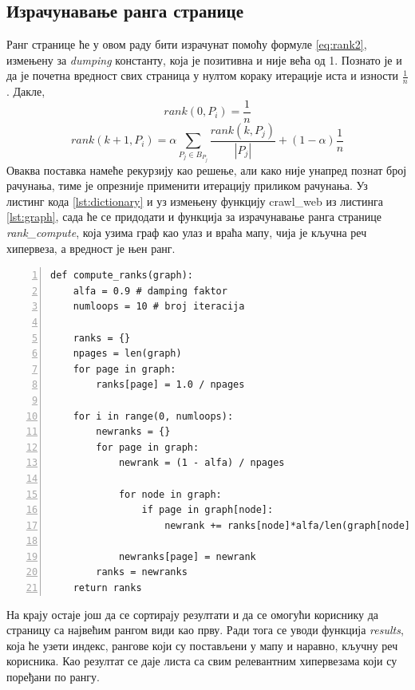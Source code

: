		\subsection{Израчунавање ранга странице}
		Ранг странице ће у овом раду бити израчунат помоћу формуле \ref{eq:rank2}, измењену за \emph{dumping} константу, која је позитивна и није већа од 1. Познато је и да је почетна вредност свих страница у нултом кораку итерације иста и изности $\frac{1}{n}$. Дакле,
		\begin{equation}\label{eq:zero}
		rank(0, P_{i})=\frac{1}{n}
		\end{equation}
		\begin{equation}
		rank(k+1, P_{i})=\alpha \sum_{P_{j} \in B_{P_{j}}}\frac{rank(k, P_{j})}{\left |P_{j}  \right |} + (1-\alpha)\frac{1}{n}
		\end{equation}
		Оваква поставка намеће рекурзију као решење, али како није унапред познат број рачунања, тиме је опрезније применити итерацију приликом рачунања. Уз листинг кода \ref{lst:dictionary} и уз измењену функцију crawl\_web из листинга \ref{lst:graph}, сада ће се придодати и функција за израчунавање ранга странице \emph{rank\_compute}, која узима граф као улаз и враћа мапу, чија је кључна реч хипервеза, а вредност је њен ранг.
		\pagebreak
		\begin{lstlisting}[caption=Израчунавање ранга странице, label={lst:rank}, numbers=left]
def compute_ranks(graph):
    alfa = 0.9 # damping faktor
    numloops = 10 # broj iteracija
    
    ranks = {}
    npages = len(graph)
    for page in graph:
        ranks[page] = 1.0 / npages
    
    for i in range(0, numloops):
        newranks = {}
        for page in graph:
            newrank = (1 - alfa) / npages
            
            for node in graph:
                if page in graph[node]:
                    newrank += ranks[node]*alfa/len(graph[node])
            
            newranks[page] = newrank
        ranks = newranks
    return ranks
		\end{lstlisting}
		На крају остаје још да се сортирају резултати и да се омогући кориснику да страницу са највећим рангом види као прву. Ради тога се уводи функција \emph{results}, која ће узети индекс, рангове који су постављени у мапу и наравно, кључну реч корисника. Као резултат се даје листа са свим релевантним хипервезама који су поређани по рангу. 
